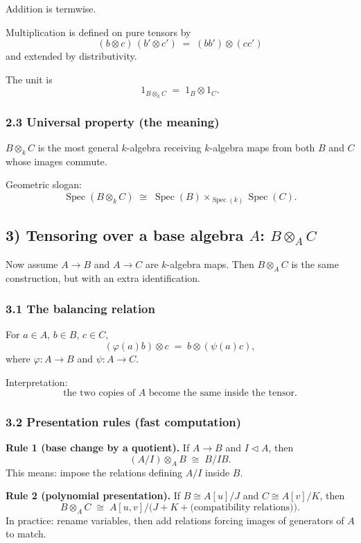 \documentclass[12pt,a4paper]{article}
\DeclareMathOperator{\Spec}{Spec}
\theoremstyle{plain}
\theoremstyle{definition}      %
\begin{document}
	Addition is termwise.
	
	Multiplication is defined on pure tensors by
	\[
	(b\otimes c)\,(b'\otimes c') \;=\; (bb')\otimes (cc')
	\]
	and extended by distributivity.
	
	The unit is
	\[
	1_{B\otimes_k C} \;=\; 1_B\otimes 1_C.
	\]
	
	\subsubsection*{2.3 Universal property (the meaning)}
	
	\(B\otimes_k C\) is the most general \(k\)-algebra receiving \(k\)-algebra maps from both
	\(B\) and \(C\) whose images commute.
	
	Geometric slogan:
	\[
	\Spec(B\otimes_k C)\;\cong\;\Spec(B)\times_{\Spec(k)}\Spec(C).
	\]
	
	\subsection*{3) Tensoring over a base algebra \(A\): \(B\otimes_A C\)}
	
	Now assume \(A\to B\) and \(A\to C\) are \(k\)-algebra maps.
	Then \(B\otimes_A C\) is the same construction, but with an extra identification.
	
	\subsubsection*{3.1 The balancing relation}
	
	For \(a\in A\), \(b\in B\), \(c\in C\),
	\[
	(\varphi(a)b)\otimes c \;=\; b\otimes (\psi(a)c),
	\]
	where \(\varphi:A\to B\) and \(\psi:A\to C\).
	
	Interpretation:
	\[
	\text{the two copies of } A \text{ become the same inside the tensor.}
	\]
	
	\subsubsection*{3.2 Presentation rules (fast computation)}
	
	\textbf{Rule 1 (base change by a quotient).}
	If \(A\to B\) and \(I\triangleleft A\), then
	\[
	(A/I)\otimes_A B \;\cong\; B/IB.
	\]
	This means: impose the relations defining \(A/I\) inside \(B\).
	
	\medskip
	\textbf{Rule 2 (polynomial presentation).}
	If \(B\cong A[u]/J\) and \(C\cong A[v]/K\), then
	\[
	B\otimes_A C \;\cong\; A[u,v]/\bigl(J+K+\text{(compatibility relations)}\bigr).
	\]
	In practice: rename variables, then add relations forcing images of generators of \(A\) to match.
	
\end{document}
